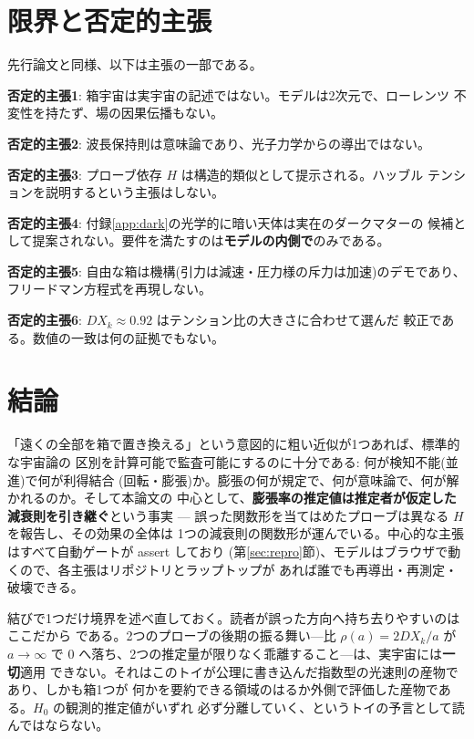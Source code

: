 \documentclass[a4paper,10pt,twocolumn]{ltjsarticle}
\begin{document}
\section{限界と否定的主張}
\label{sec:negative}

先行論文と同様、以下は主張の一部である。

\textbf{否定的主張1}: 箱宇宙は実宇宙の記述ではない。モデルは2次元で、ローレンツ
不変性を持たず、場の因果伝播もない。

\textbf{否定的主張2}: 波長保持則は意味論であり、光子力学からの導出ではない。

\textbf{否定的主張3}: プローブ依存 $H$ は構造的類似として提示される。ハッブル
テンションを説明するという主張はしない。

\textbf{否定的主張4}: 付録\ref{app:dark}の光学的に暗い天体は実在のダークマターの
候補として提案されない。要件を満たすのは\textbf{モデルの内側で}のみである。

\textbf{否定的主張5}: 自由な箱は機構(引力は減速・圧力様の斥力は加速)のデモであり、
フリードマン方程式を再現しない。

\textbf{否定的主張6}: $D X_k\approx0.92$ はテンション比の大きさに合わせて選んだ
較正である。数値の一致は何の証拠でもない。

\section{結論}
\label{sec:conclusion}

「遠くの全部を箱で置き換える」という意図的に粗い近似が1つあれば、標準的な宇宙論の
区別を計算可能で監査可能にするのに十分である: 何が検知不能(並進)で何が利得結合
(回転・膨張)か。膨張の何が規定で、何が意味論で、何が解かれるのか。そして本論文の
中心として、\textbf{膨張率の推定値は推定者が仮定した減衰則を引き継ぐ}という事実 ---
誤った関数形を当てはめたプローブは異なる $H$ を報告し、その効果の全体は
1つの減衰則の関数形が運んでいる。中心的な主張はすべて自動ゲートが assert しており
(第\ref{sec:repro}節)、モデルはブラウザで動くので、各主張はリポジトリとラップトップが
あれば誰でも再導出・再測定・破壊できる。

結びで1つだけ境界を述べ直しておく。読者が誤った方向へ持ち去りやすいのはここだから
である。2つのプローブの後期の振る舞い---比 $\rho(a)=2D X_k/a$ が $a\to\infty$ で
0 へ落ち、2つの推定量が限りなく乖離すること---は、実宇宙には\textbf{一切}適用
できない。それはこのトイが公理に書き込んだ指数型の光速則の産物であり、しかも箱1つが
何かを要約できる領域のはるか外側で評価した産物である。$H_0$ の観測的推定値がいずれ
必ず分離していく、というトイの予言として読んではならない。
\end{document}
